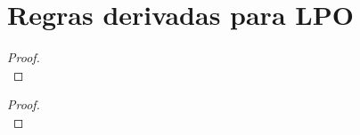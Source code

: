 \begin{minipage}{\textwidth} %
\section{Regras derivadas para LPO}

\begin{multicols}{2}
\begin{proof}

\\	
\end{proof}
\begin{proof}

\\	
\end{proof}
\end{multicols}
\end{minipage}
